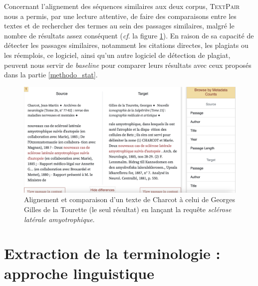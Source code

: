 Concernant l'alignement des séquences similaires aux deux corpus, \textsc{TextPair} nous a permis, par une lecture attentive, de faire des comparaisons entre les textes et de rechercher des termes au sein des passages similaires, malgré le nombre de résultats assez conséquent (\textit{cf}. la figure \ref{fig:textpair}). En raison de sa capacité de détecter les passages similaires, notamment les citations directes, les plagiats ou les réemplois, ce logiciel, ainsi qu'un autre logiciel de détection de plagiat, peuvent nous servir de \textit{baseline} pour comparer leurs résultats avec ceux proposés dans la partie \ref{methodo_stat}.

\begin{figure}[!ht]
    \centering
    \includegraphics[width=1\textwidth]{img/textpair.png}
    \caption{Alignement et comparaison d'un texte de Charcot à celui de Georges Gilles de la Tourette (le seul résultat) en lançant la requête \textit{sclérose latérale amyotrophique}.}
    \label{fig:textpair}
\end{figure}

\section{Extraction de la terminologie : approche linguistique}

